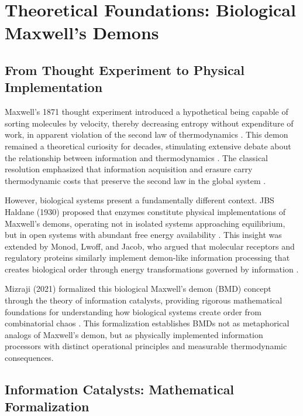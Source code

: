 \section{Theoretical Foundations: Biological Maxwell's Demons}

\subsection{From Thought Experiment to Physical Implementation}

Maxwell's 1871 thought experiment introduced a hypothetical being capable of sorting molecules by velocity, thereby decreasing entropy without expenditure of work, in apparent violation of the second law of thermodynamics \cite{Maxwell1871}. This demon remained a theoretical curiosity for decades, stimulating extensive debate about the relationship between information and thermodynamics \cite{Szilard1929,Brillouin1951,Landauer1961,Bennett1982}. The classical resolution emphasized that information acquisition and erasure carry thermodynamic costs that preserve the second law in the global system \cite{Leff1990}.

However, biological systems present a fundamentally different context. JBS Haldane (1930) proposed that enzymes constitute physical implementations of Maxwell's demons, operating not in isolated systems approaching equilibrium, but in open systems with abundant free energy availability \cite{Haldane1930}. This insight was extended by Monod, Lwoff, and Jacob, who argued that molecular receptors and regulatory proteins similarly implement demon-like information processing that creates biological order through energy transformations governed by information \cite{Monod1971,Jacob1977,Lwoff1962}.

Mizraji (2021) formalized this biological Maxwell's demon (BMD) concept through the theory of information catalysts, providing rigorous mathematical foundations for understanding how biological systems create order from combinatorial chaos \cite{Mizraji2021}. This formalization establishes BMDs not as metaphorical analogs of Maxwell's demon, but as physically implemented information processors with distinct operational principles and measurable thermodynamic consequences.

\subsection{Information Catalysts: Mathematical Formalization}


